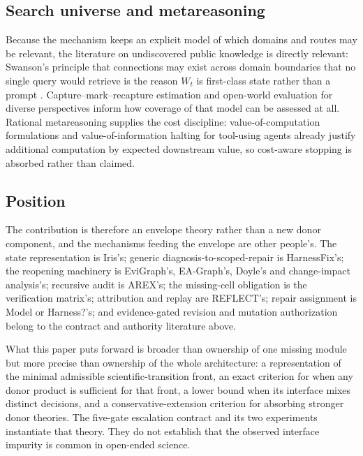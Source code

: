 \subsection{Search universe and metareasoning}

Because the mechanism keeps an explicit model of which domains and routes may be
relevant, the literature on undiscovered public knowledge is directly relevant:
Swanson's principle that connections may exist across domain boundaries that no
single query would retrieve is the reason $W_t$ is first-class state rather than
a prompt \cite{swanson1986}. Capture--mark--recapture estimation
\cite{kastner2009} and open-world evaluation for diverse perspectives
\cite{chenchoi2025} inform how coverage of that model can be assessed at all.
Rational metareasoning supplies the cost discipline: value-of-computation
formulations \cite{desabbata2024} and value-of-information halting for
tool-using agents \cite{cognitivefriction2026} already justify additional
computation by expected downstream value, so cost-aware stopping is absorbed
rather than claimed.

\subsection{Position}

The contribution is therefore an envelope theory rather than a new donor
component, and the mechanisms feeding the envelope are other people's. The
state representation is Iris's; generic diagnosis-to-scoped-repair is
HarnessFix's; the reopening machinery is EviGraph's, EA-Graph's, Doyle's and
change-impact analysis's; recursive audit is AREX's; the missing-cell obligation
is the verification matrix's; attribution and replay are REFLECT's; repair
assignment is Model or Harness?'s; and evidence-gated revision and mutation
authorization belong to the contract and authority literature above.

What this paper puts forward is broader than ownership of one missing module but
more precise than ownership of the whole architecture: a representation of the
minimal admissible scientific-transition front, an exact criterion for when any
donor product is sufficient for that front, a lower bound when its interface
mixes distinct decisions, and a conservative-extension criterion for absorbing
stronger donor theories. The five-gate escalation contract and its two
experiments instantiate that theory. They do not establish that the observed
interface impurity is common in open-ended science.
